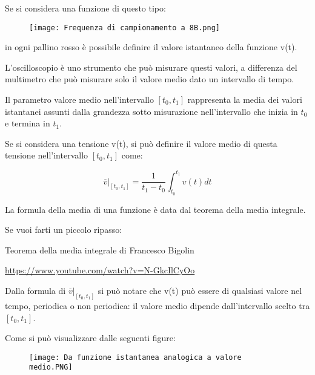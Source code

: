 Se si considera una funzione di questo tipo: 

\begin{figure}[h]
    \centering
    \texttt{[image: Frequenza di campionamento a 8B.png]}
\end{figure}

in ogni pallino rosso è possibile definire il valore istantaneo della funzione v(t). \newline 

L'oscilloscopio è uno strumento che può misurare questi valori, 
a differenza del multimetro che può misurare solo il valore medio dato un intervallo di tempo. \newline 

Il parametro valore medio nell'intervallo $[t_0, t_1]$ rappresenta la media dei valori istantanei 
assunti dalla grandezza sotto misurazione nell'intervallo che inizia in $t_0$ e termina in $t_1$. \newline 

Se si considera una tensione v(t), si può definire il valore medio di questa tensione nell'intervallo $[t_0, t_1]$ come: 

{
    \Large 
    \begin{equation}
        \left. \overline{v} \right|_{[t_0, t_1]} 
        = 
        \frac{1}{t_1 - t_0}
        \int_{t_0}^{t_1} 
        v(t) dt
    \end{equation}
}


\begin{tcolorbox}
    La formula della media di una funzione è data dal teorema della media integrale. \newline 
    
    Se vuoi farti un piccolo ripasso: 

    Teorema della media integrale di Francesco Bigolin 

    \url{https://www.youtube.com/watch?v=N-GkcIlCyOo}

\end{tcolorbox}

Dalla formula di $ \left. \overline{v} \right|_{[t_0, t_1]}$ 
si può notare che v(t) può essere di qualsiasi valore nel tempo, periodica o non periodica: 
il valore medio dipende dall'intervallo scelto tra $[t_0, t_1]$. \newline 

\newpage 

Come si può visualizzare dalle seguenti figure: 

\begin{figure}[h]
    \centering
    \texttt{[image: Da funzione istantanea analogica a valore medio.PNG]}
\end{figure}



